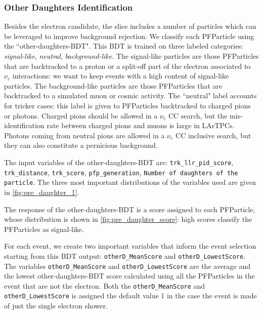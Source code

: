 \subsubsection{Other Daughters Identification}
Besides the electron candidate, the slice includes a number of particles which can be leveraged to improve background rejection. We classify each PFParticle using the ``other-daughters-BDT". This BDT is trained on three labeled categories: \emph{signal-like}, \emph{neutral}, \emph{background-like}. The signal-like particles are those PFParticles that are backtracked to a proton or a split-off part of the electron associated to $\nu_e$ interactions: we want to keep events with a high content of signal-like particles. The background-like particles are those PFParticles that are backtracked to a simulated muon or cosmic activity.
The ``neutral" label accounts for tricker cases: this label is given to PFParticles backtracked to charged pions or photons. Charged pions should be allowed in a $\nu_e$ CC search, but the mis-identification rate between charged pions and muons is large in LArTPCs. Photons coming from neutral pions are allowed in a  $\nu_e$ CC inclusive search, but they can also constitute a pernicious background.

The input variables of the other-daughters-BDT are:  \texttt{trk\_llr\_pid\_score}, \texttt{trk\_distance}, \texttt{trk\_score}, 
\texttt{pfp\_generation}, \texttt{Number of daughters of the particle}.
The three most important distributions of the variables used are given in \cref{fig:pre_daughter_1}.  


The response of the other-daughters-BDT is a score assigned to each PFParticle, whose distribution is shown in \cref{fig:pre_daughter_score}: high scores classify the PFParticles as signal-like. 

For each event, we create two important variables that inform the event selection starting from this BDT output:  \texttt{otherD\_MeanScore} and \texttt{otherD\_LowestScore}.  The variables \texttt{otherD\_MeanScore} and   \texttt{otherD\_LowestScore} are the average and the lowest other-daughters-BDT score calculated using all the PFParticles in the event that are not the electron. Both the  \texttt{otherD\_MeanScore} and  \texttt{otherD\_LowestScore}  is assigned the default value 1 in the case the event is made of just the single electron shower.






